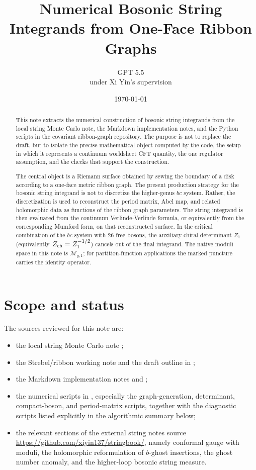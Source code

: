 \documentclass[11pt]{article}
\title{Numerical Bosonic String Integrands from One-Face Ribbon Graphs}
\author{GPT 5.5\\under Xi Yin's supervision}
\date{\today}
\numberwithin{equation}{section}
\newcommand{\cM}{\mathcal M}
\begin{document}
\maketitle

\begin{abstract}
This note extracts the numerical construction of bosonic string integrands from
the local string Monte Carlo note, the Markdown implementation notes, and the
Python scripts in the covariant ribbon-graph repository.  The purpose is not to
replace the draft, but to isolate the precise mathematical object computed by
the code, the setup in which it represents a continuum worldsheet CFT quantity,
the one regulator assumption, and the checks that support the construction.

The central object is a Riemann surface obtained by sewing the boundary of a
disk according to a one-face metric ribbon graph.  The present production
strategy for the bosonic string integrand is not to discretize the higher-genus
\(bc\) system.  Rather, the discretization is used to reconstruct the period
matrix, Abel map, and related holomorphic data as functions of the ribbon graph
parameters.  The string integrand is then evaluated from the continuum
Verlinde-Verlinde formula, or equivalently from the corresponding Mumford form,
on that reconstructed surface.  In the critical combination of the \(bc\) system
with \(26\) free bosons, the auxiliary chiral determinant \(Z_1\) (equivalently
\(Z_{\rm ch}=Z_1^{-1/2}\)) cancels out of the final integrand.  The native
moduli space in this note is \(\cM_{g,1}\); for partition-function applications
the marked puncture carries the identity operator.
\end{abstract}

\tableofcontents

\section{Scope and status}

The sources reviewed for this note are:
\begin{itemize}
\item the local string Monte Carlo note
  ;
\item the Strebel/ribbon working note  and the draft
  outline in ;
\item the Markdown implementation notes
   and
  ;
\item the numerical scripts in , especially
  the graph-generation, determinant, compact-boson, and period-matrix scripts,
  together with the diagnostic scripts listed explicitly in the algorithmic
  summary below;
\item the relevant sections of the external string notes source
  \url{https://github.com/xiyin137/stringbook/},
  namely conformal gauge with moduli, the holomorphic reformulation of
  \(b\)-ghost insertions, the ghost number anomaly, and the higher-loop
  bosonic string measure.
\end{itemize}
\end{document}
